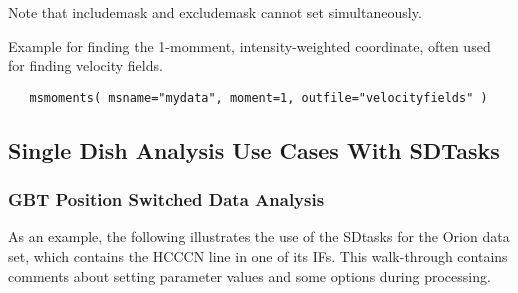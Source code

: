 Note that includemask and excludemask cannot set simultaneously. 

Example for finding the 1-momment, intensity-weighted
coordinate, often used for finding velocity fields.

\begin{verbatim}
   msmoments( msname="mydata", moment=1, outfile="velocityfields" )
\end{verbatim}



\subsection{Single Dish Analysis Use Cases With SDTasks}
\label{section:sd.sdtasks.usecase}

\subsubsection{GBT Position Switched Data Analysis}
As an example, the following illustrates the use of the SDtasks for
the Orion data set, which contains the HCCCN line in one of its IFs.
This walk-through contains comments about setting parameter values
and some options during processing.

